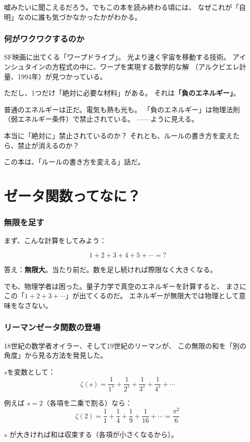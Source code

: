 \documentclass[12pt,a4paper]{article}
\begin{document}
嘘みたいに聞こえるだろう。でもこの本を読み終わる頃には、
なぜこれが「自明」なのに誰も気づかなかったかがわかる。

\section{何がワクワクするのか}

SF映画に出てくる「ワープドライブ」。
光より速く宇宙を移動する技術。
アインシュタインの方程式の中に、ワープを実現する数学的な解
（アルクビエレ計量、1994年）が見つかっている。

ただし、1つだけ「絶対に必要な材料」がある。
それは\textbf{「負のエネルギー」}。

普通のエネルギーは正だ。電気も熱も光も。
「負のエネルギー」は物理法則（弱エネルギー条件）で禁止されている。
——ように見える。

本当に「絶対に」禁止されているのか？
それとも、ルールの書き方を変えたら、禁止が消えるのか？

この本は、「ルールの書き方を変える」話だ。

\part{ゼータ関数ってなに？}

\section{無限を足す}

まず、こんな計算をしてみよう：

$$1 + 2 + 3 + 4 + 5 + \cdots = ?$$

答え：\textbf{無限大}。当たり前だ。数を足し続ければ際限なく大きくなる。

でも、物理学者は困った。量子力学で真空のエネルギーを計算すると、
まさにこの「$1 + 2 + 3 + \cdots$」が出てくるのだ。
エネルギーが無限大では物理として意味をなさない。

\section{リーマンゼータ関数の登場}

18世紀の数学者オイラー、そして19世紀のリーマンが、
この無限の和を「別の角度」から見る方法を発見した。

\begin{mathbox}[リーマンゼータ関数]
$s$を変数として：
$$\zeta(s) = \frac{1}{1^s} + \frac{1}{2^s} + \frac{1}{3^s} + \frac{1}{4^s} + \cdots$$

例えば $s = 2$（各項を二乗で割る）なら：
$$\zeta(2) = \frac{1}{1} + \frac{1}{4} + \frac{1}{9} + \frac{1}{16} + \cdots = \frac{\pi^2}{6}$$

$s$ が大きければ和は収束する（各項が小さくなるから）。
\end{mathbox}
\end{document}
